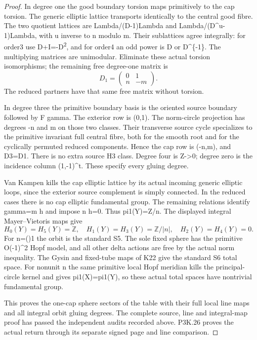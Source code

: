 \begin{proof}
In degree one the good boundary torsion maps primitively to the
cap torsion. The generic elliptic lattice transports identically
to the central good fibre. The two quotient lattices are
Lambda/(D-1)Lambda and Lambda/(D\^{}u-1)Lambda, with u inverse
to n modulo m. Their sublattices agree integrally: for order3
use D+I=-D\textsuperscript{2}, and for order4 an odd power is D or D\^{}\{-1\}.
The multiplying matrices are unimodular. Eliminate these actual
torsion isomorphisms; the remaining free degree-one matrix is
\[
                         D_1=\begin{pmatrix}0&1\\ n&-m\end{pmatrix}.
\]
The reduced partners have that same free matrix without torsion.

In degree three the primitive boundary basis is the oriented
source boundary followed by F gamma. The exterior row is (0,1).
The norm-circle projection has degrees -n and m on those two
classes. Their transverse source cycle specializes to the primitive
invariant full central fibre, both for the smooth root and for
the cyclically permuted reduced components. Hence the cap row
is (-n,m), and D3=D1. There is no extra source H3 class. Degree
four is Z-\textgreater0; degree zero is the incidence column (1,-1)\^{}t.
These specify every gluing degree.

Van Kampen kills the cap elliptic lattice by its actual incoming
generic elliptic loops, since the exterior source complement is
simply connected. In the reduced cases there is no cap elliptic
fundamental group. The remaining relations identify gamma=m h
and impose n h=0. Thus pi1(Y)=Z/\textbar n\textbar. The displayed integral
Mayer--Vietoris maps give
\[
 H_0(Y)=H_5(Y)=\mathbb Z,\quad
 H_1(Y)=H_3(Y)=\mathbb Z/|n|,\quad H_2(Y)=H_4(Y)=0.       \tag{SC.4}
\]
For n=(\pm)1 the orbit is the standard S5. The sole fixed sphere has
the primitive O(-1)\^{}2 Hopf model, and all other delta actions are
free by the actual norm inequality. The Gysin and fixed-tube maps
of K22 give the standard S6 total space. For nonunit n the
same primitive local Hopf meridian kills the principal-circle
kernel and gives pi1(X)=pi1(Y), so these actual total spaces
have nontrivial fundamental group.

This proves the one-cap sphere sectors of the table with their
full local line maps and all integral orbit gluing degrees.
The complete source, line and integral-map proof has passed the
independent audits recorded above. P3K.26 proves the actual return
through its separate signed page and line comparison.
\end{proof}
